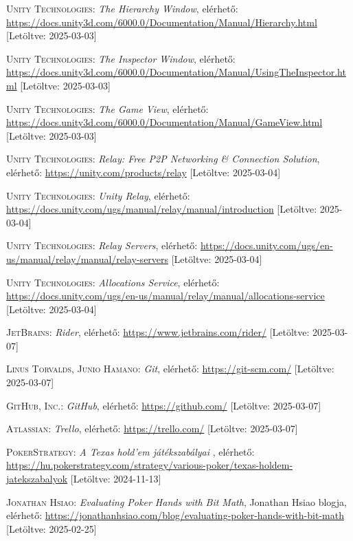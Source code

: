 \documentclass[]{thesis-ekf}
\theoremstyle{definition}
\theoremstyle{remark}
\begin{document}
\begin{thebibliography}{2}
	\textsc{Unity Technologies}: \emph{The Hierarchy Window}, elérhető:
	\url{https://docs.unity3d.com/6000.0/Documentation/Manual/Hierarchy.html} [Letöltve: 2025-03-03]
	
	\textsc{Unity Technologies}: \emph{The Inspector Window}, elérhető:
	\url{https://docs.unity3d.com/6000.0/Documentation/Manual/UsingTheInspector.html} [Letöltve: 2025-03-03]
	
	\textsc{Unity Technologies}: \emph{The Game View}, elérhető:
	\url{https://docs.unity3d.com/6000.0/Documentation/Manual/GameView.html} [Letöltve: 2025-03-03]
	
	\textsc{Unity Technologies}: \emph{Relay: Free P2P Networking \& Connection Solution}, elérhető:
	\url{https://unity.com/products/relay} [Letöltve: 2025-03-04]
	
	\textsc{Unity Technologies}: \emph{Unity Relay}, elérhető:
	\url{https://docs.unity.com/ugs/manual/relay/manual/introduction} [Letöltve: 2025-03-04]
	
	\textsc{Unity Technologies}: \emph{Relay Servers}, elérhető:
	\url{https://docs.unity.com/ugs/en-us/manual/relay/manual/relay-servers} [Letöltve: 2025-03-04]
	
	\textsc{Unity Technologies}: \emph{Allocations Service}, elérhető:
	\url{https://docs.unity.com/ugs/en-us/manual/relay/manual/allocations-service} [Letöltve: 2025-03-04]
	
	\textsc{JetBrains}: \emph{Rider}, elérhető:
	\url{https://www.jetbrains.com/rider/} [Letöltve: 2025-03-07]
	
	\textsc{Linus Torvalds, Junio Hamano}: \emph{Git}, elérhető:
	\url{https://git-scm.com/} [Letöltve: 2025-03-07]
	
	\textsc{GitHub, Inc.}: \emph{GitHub}, elérhető:
	\url{https://github.com/} [Letöltve: 2025-03-07]
	
	\textsc{Atlassian}: \emph{Trello}, elérhető:
	\url{https://trello.com/} [Letöltve: 2025-03-07]
	
	\textsc{PokerStrategy}: \emph{A Texas hold'em játékszabályai
	}, elérhető: \url{	https://hu.pokerstrategy.com/strategy/various-poker/texas-holdem-jatekszabalyok} [Letöltve: 2024-11-13]
	
	\textsc{Jonathan Hsiao}: \emph{Evaluating Poker Hands with Bit Math}, Jonathan Hsiao blogja, elérhető: \url{https://jonathanhsiao.com/blog/evaluating-poker-hands-with-bit-math} [Letöltve: 2025-02-25]
	

\end{thebibliography}
\end{document}

